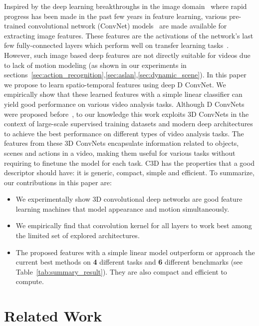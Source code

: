 \documentclass[10pt,twocolumn,letterpaper]{article}
\begin{document}
Inspired by the deep learning breakthroughs in the image domain~\cite{Krizhevsky12} where rapid progress has been made in the past few years in feature learning, various pre-trained convolutional network (ConvNet) models~\cite{jia2014caffe} are made available for extracting image features. These features are the activations of the network's last few fully-connected layers which perform well on transfer learning tasks~\cite{Ning14,Zhou2014}. However, such image based deep features are not directly suitable for videos due to lack of motion modeling (as shown in our experiments in sections~\ref{sec:action_recognition},\ref{sec:aslan},\ref{sec:dynamic_scene}). In this paper we propose to learn spatio-temporal features using deep D ConvNet. We empirically show that these learned features with a simple linear classifier can yield good performance on various video analysis tasks. Although D ConvNets were proposed before~\cite{Ming2013,Karpathy14}, to our knowledge this work exploits 3D ConvNets in the context of large-scale supervised training datasets and modern deep architectures to achieve the best performance on different types of video analysis tasks. The features from these 3D ConvNets encapsulate information related to objects, scenes and actions in a video, making them useful for various tasks without requiring to finetune the model for each task. C3D has the properties that a good descriptor should have: it is generic, compact, simple and efficient. To summarize, our contributions in this paper are:

\begin{itemize}
\item We experimentally show 3D convolutional deep networks are good feature learning machines that model appearance and motion simultaneously.
\vspace{-5pt}
\item We empirically find that  convolution kernel for all layers to work best among the limited set of explored architectures.
\vspace{-5pt}
\item The proposed features with a simple linear model outperform or approach the current best methods on {\bf 4} different tasks and {\bf 6} different benchmarks (see Table~\ref{tab:summary_result}). They are also compact and efficient to compute.
\end{itemize}
 
\vspace{-6pt}
\section{Related Work}
\label{sec:relwork}
\end{document}
